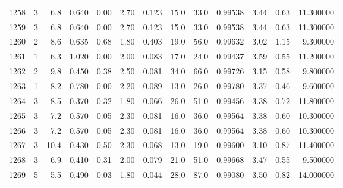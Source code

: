 \begin{tabular}{lrrrrrrrrrrrr}
1258 &        3 &            6.8 &             0.640 &         0.00 &            2.70 &      0.123 &                 15.0 &                  33.0 &  0.99538 &  3.44 &       0.63 &  11.300000 \\
1259 &        3 &            6.8 &             0.640 &         0.00 &            2.70 &      0.123 &                 15.0 &                  33.0 &  0.99538 &  3.44 &       0.63 &  11.300000 \\
1260 &        2 &            8.6 &             0.635 &         0.68 &            1.80 &      0.403 &                 19.0 &                  56.0 &  0.99632 &  3.02 &       1.15 &   9.300000 \\
1261 &        1 &            6.3 &             1.020 &         0.00 &            2.00 &      0.083 &                 17.0 &                  24.0 &  0.99437 &  3.59 &       0.55 &  11.200000 \\
1262 &        2 &            9.8 &             0.450 &         0.38 &            2.50 &      0.081 &                 34.0 &                  66.0 &  0.99726 &  3.15 &       0.58 &   9.800000 \\
1263 &        1 &            8.2 &             0.780 &         0.00 &            2.20 &      0.089 &                 13.0 &                  26.0 &  0.99780 &  3.37 &       0.46 &   9.600000 \\
1264 &        3 &            8.5 &             0.370 &         0.32 &            1.80 &      0.066 &                 26.0 &                  51.0 &  0.99456 &  3.38 &       0.72 &  11.800000 \\
1265 &        3 &            7.2 &             0.570 &         0.05 &            2.30 &      0.081 &                 16.0 &                  36.0 &  0.99564 &  3.38 &       0.60 &  10.300000 \\
1266 &        3 &            7.2 &             0.570 &         0.05 &            2.30 &      0.081 &                 16.0 &                  36.0 &  0.99564 &  3.38 &       0.60 &  10.300000 \\
1267 &        3 &           10.4 &             0.430 &         0.50 &            2.30 &      0.068 &                 13.0 &                  19.0 &  0.99600 &  3.10 &       0.87 &  11.400000 \\
1268 &        3 &            6.9 &             0.410 &         0.31 &            2.00 &      0.079 &                 21.0 &                  51.0 &  0.99668 &  3.47 &       0.55 &   9.500000 \\
1269 &        5 &            5.5 &             0.490 &         0.03 &            1.80 &      0.044 &                 28.0 &                  87.0 &  0.99080 &  3.50 &       0.82 &  14.000000 \\

\end{tabular}
